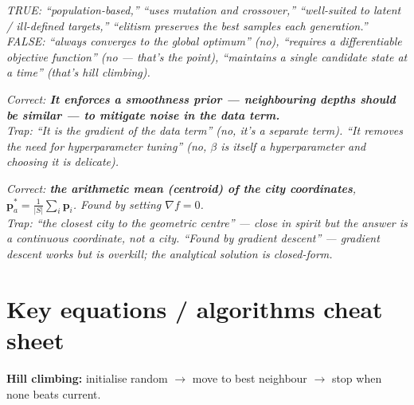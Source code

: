 \documentclass[11pt, a4paper]{article}
\begin{document}
\begin{exambox}
\textit{TRUE: ``population-based,'' ``uses mutation and crossover,'' ``well-suited to latent / ill-defined targets,'' ``elitism preserves the best samples each generation.''}\\[0.3em]
\textit{FALSE: ``always converges to the global optimum'' (no), ``requires a differentiable objective function'' (no — that's the point), ``maintains a single candidate state at a time'' (that's hill climbing).}
\end{exambox}

\begin{exambox}[(MCQ): The objective function $F(X) = D(X) + \beta \cdot R(X)$ is being designed for a 3D reconstruction problem. The data term $D(X)$ has high noise because of stereo mismatches. What is the role of the regularisation term $R(X) = (X_1 - X_2)^2$?]
\textit{Correct: \textbf{It enforces a smoothness prior — neighbouring depths should be similar — to mitigate noise in the data term.}}\\[0.3em]
\textit{Trap: ``It is the gradient of the data term'' (no, it's a separate term). ``It removes the need for hyperparameter tuning'' (no, $\beta$ is itself a hyperparameter and choosing it is delicate).}
\end{exambox}

\begin{exambox}
\textit{Correct: \textbf{the arithmetic mean (centroid) of the city coordinates}, $\mathbf{p}_a^* = \frac{1}{|S|} \sum_i \mathbf{p}_i$. Found by setting $\nabla f = 0$.}\\[0.3em]
\textit{Trap: ``the closest city to the geometric centre'' — close in spirit but the answer is a continuous coordinate, not a city. ``Found by gradient descent'' — gradient descent works but is overkill; the analytical solution is closed-form.}
\end{exambox}

\section*{Key equations / algorithms cheat sheet}

\textbf{Hill climbing:} initialise random $\to$ move to best neighbour $\to$ stop when none beats current.
\end{document}
